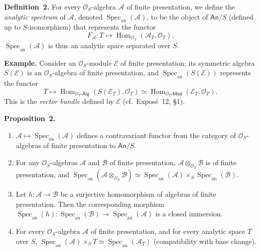 \documentclass[british]{article}
\providecommand{\tightlist}{%
\setlength{\itemsep}{0pt}\setlength{\parskip}{0pt}}
\newenvironment{itenv}[1]
  {\phantomsection\par\smallskip\noindent\textbf{#1.}\itshape}
  {\par\smallskip}
\newenvironment{rmenv}[1]
  {\phantomsection\par\smallskip\noindent\textbf{#1.}\rmfamily}
  {\par\smallskip}
\newcommand{\oldpage}[1]{\marginpar{\footnotesize$\Big\vert$ \textit{p.~#1}}}
\begin{document}
\protect{}\label{definition-2}
\begin{rmenv}{Definition 2}
For every \({\mathscr{O}}_S\)-algebra \({\mathscr{A}}\) of finite
presentation, we define the \emph{analytic spectrum} of
\({\mathscr{A}}\), denoted
\(\operatorname{Spec}_\mathrm{an}({\mathscr{A}})\), to be the object of
\(\mathsf{An}/S\) (defined up to \(S\)-isomorphism) that represents the
functor \[
  F_{\mathscr{A}}\colon T\longmapsto \operatorname{Hom}_{{\mathscr{O}}_T}({\mathscr{A}}_T,{\mathscr{O}}_T).
\] \oldpage{19-3} \(\operatorname{Spec}_\mathrm{an}({\mathscr{A}})\) is
thus an analytic space separated over \(S\).

\end{rmenv}

\begin{rmenv}{Example}
Consider an \({\mathscr{O}}_S\)-module \({\mathscr{E}}\) of finite
presentation; its symmetric algebra \(S({\mathscr{E}})\) is an
\({\mathscr{O}}_S\)-algebra of finite presentation, and
\(\operatorname{Spec}_\mathrm{an}(S({\mathscr{E}}))\) represents the
functor \[
  T\longmapsto
  \operatorname{Hom}_{{{\mathscr{O}}_T}\text{-}\mathsf{Alg}}(S({\mathscr{E}}_T),{\mathscr{O}}_T)
  \simeq \operatorname{Hom}_{{{\mathscr{O}}_T}\text{-}\mathsf{Mod}}({\mathscr{E}}_T,{\mathscr{O}}_T).
\] This is the \emph{vector bundle} defined by \({\mathscr{E}}\)
(cf.~Exposé~12, §1).

\end{rmenv}

\protect{}\label{proposition-2}
\begin{itenv}{Proposition 2}

\begin{enumerate}
\def\labelenumi{\roman{enumi}.}
\tightlist
\item
  \({\mathscr{A}}\mapsto\operatorname{Spec}_\mathrm{an}({\mathscr{A}})\)
  defines a contravariant functor from the category of
  \({\mathscr{O}}_S\)-algebras of finite presentation to
  \(\mathsf{An}/S\).
\item
  For any \({\mathscr{O}}_S\)-algebras \({\mathscr{A}}\) and
  \({\mathscr{B}}\) of finite presentation,
  \({\mathscr{A}}\otimes_{{\mathscr{O}}_S}{\mathscr{B}}\) is of finite
  presentation, and
  \(\operatorname{Spec}_\mathrm{an}({\mathscr{A}}\otimes_{{\mathscr{O}}_S}{\mathscr{B}})\simeq\operatorname{Spec}_\mathrm{an}({\mathscr{A}})\times_S\operatorname{Spec}_\mathrm{an}({\mathscr{B}})\).
\item
  Let \(h\colon{\mathscr{A}}\to{\mathscr{B}}\) be a surjective
  homomorphism of algebras of finite presentation. Then the
  corresponding morphism
  \(\operatorname{Spec}_\mathrm{an}(h)\colon\operatorname{Spec}_\mathrm{an}({\mathscr{B}})\to\operatorname{Spec}_\mathrm{an}({\mathscr{A}})\)
  is a closed immersion.
\item
  For every \({\mathscr{O}}_S\)-algebra \({\mathscr{A}}\) of finite
  presentation, and for every analytic space \(T\) over \(S\),
  \(\operatorname{Spec}_\mathrm{an}({\mathscr{A}})\times_S T\simeq\operatorname{Spec}_\mathrm{an}({\mathscr{A}}_T)\)
  (compatibility with base change).
\end{enumerate}

\end{itenv}
\end{document}
